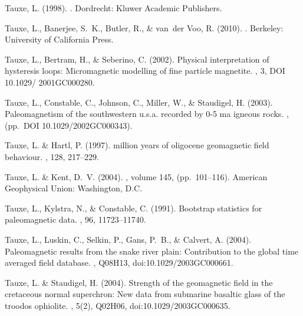 \documentclass[11pt]{book}
\begin{document}
{{\begin{thebibliography}{}
Tauxe, L. (1998).
.
\newblock Dordrecht: Kluwer Academic Publishers.

Tauxe, L., Banerjee, S.~K., Butler, R., \& van~der Voo, R. (2010).
.
\newblock Berkeley: University of California Press.

Tauxe, L., Bertram, H., \& Seberino, C. (2002).
\newblock Physical interpretation of hysteresis loops: Micromagnetic modelling
  of fine particle magnetite.
, 3, DOI 10.1029/ 2001GC000280.

Tauxe, L., Constable, C., Johnson, C., Miller, W., \& Staudigel, H. (2003).
\newblock Paleomagnetism of the southwestern u.s.a. recorded by 0-5 ma igneous
  rocks.
, (pp.\ DOI 10.1029/2002GC000343).

Tauxe, L. \& Hartl, P. (1997).
 million years of oligocene geomagnetic field behaviour.
, 128, 217--229.

Tauxe, L. \& Kent, D.~V. (2004).
, volume 145, (pp.\ 101--116).
\newblock American Geophysical Union: Washington, D.C.

Tauxe, L., Kylstra, N., \& Constable, C. (1991).
\newblock Bootstrap statistics for paleomagnetic data.
, 96, 11723--11740.

Tauxe, L., Luskin, C., Selkin, P., Gans, P.~B., \& Calvert, A. (2004).
\newblock Paleomagnetic results from the snake river plain: Contribution to the
  global time averaged field database.
, Q08H13, doi:10.1029/2003GC000661.

Tauxe, L. \& Staudigel, H. (2004).
\newblock Strength of the geomagnetic field in the cretaceous normal
  superchron: New data from submarine basaltic glass of the troodos ophiolite.
, 5(2), Q02H06,
  doi:10.1029/2003GC000635.


\end{thebibliography}}}
\end{document}
